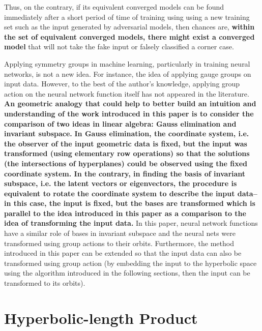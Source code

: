 \documentclass{article}
\theoremstyle{plain}
\theoremstyle{plain} %
\theoremstyle{definition}  %
\theoremstyle{remark}  %
\theoremstyle{plain}
\begin{document}
Thus, on the contrary, if its equivalent converged models can be found immediately after a short period of time of training using using a new training set such as the input generated by adversarial models, then chances are, \textbf{within the set of equivalent converged models, there might exist a converged model} that will not take the fake input or falsely classified a corner case.

Applying symmetry groups in machine learning, particularly in training neural networks, is not a new idea. For instance, the idea of applying gauge groups on input data\cite{bronstein2021geometric}. However, to the best of the author's knowledge, applying group action on the neural network function itself has not appeared in the literature. \textbf{An geometric analogy that could help to better build an intuition and understanding of the work introduced in this paper is to consider the comparison of two ideas in linear algebra: Gauss elimination and invariant subspace.} \textbf{In Gauss elimination, the coordinate system, i.e. the observer of the input geometric data is fixed, but the input was transformed (using elementary row operations) so that the solutions (the intersections of hyperplanes) could be observed using the fixed coordinate system. In the contrary, in finding the basis of invariant subspace, i.e. the latent vectors or eigenvectors, the procedure is equivalent to rotate the coordinate system to describe the input data--in this case, the input is fixed, but the bases are transformed which is parallel to the idea introduced in this paper as a comparison to the idea of transforming the input data\cite{bronstein2021geometric}.} In this paper, neural network functions have a similar role of bases in invariant subspace and the neural nets were transformed using group actions to their orbits. Furthermore, the method introduced in this paper can be extended so that the input data can also be transformed using group action (by embedding the input to the hyperbolic space using the algorithm introduced in the following sections, then the input can be transformed to its orbits).


\section{Hyperbolic-length Product}

\end{document}
